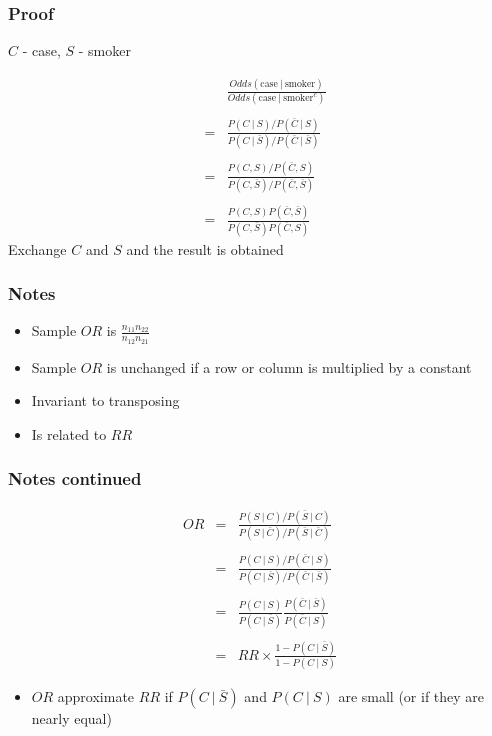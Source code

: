 \documentclass[aspectratio=169]{beamer}
\begin{document}
\begin{frame}\frametitle{Proof}
$C$ - case, $S$ - smoker

\begin{eqnarray*}
& &\frac{Odds(\mbox{case} ~|~ \mbox{smoker})}{Odds(\mbox{case} ~|~ \mbox{smoker}^c)}\\ \\
& = & \frac{P(C ~ | ~ S) / P(\bar{C} ~|~ S)}{P(C ~|~ \bar{S})/P(\bar{C} ~|~ \bar{S})} \\ \\
& = & \frac{P(C, S) / P(\bar{C}, S)}{P(C, \bar{S})/P(\bar{C}, \bar{S})} \\ \\
& = & \frac{P(C, S) P(\bar{C}, \bar{S})}{P(C,\bar{S}) P(\bar{C}, S)}
\end{eqnarray*}
Exchange $C$ and $S$ and the result is obtained
\end{frame}

\begin{frame}\frametitle{Notes}
\begin{itemize}
\item Sample $OR$ is $\frac{n_{11}n_{22}}{n_{12}n_{21}}$
\item Sample $OR$ is unchanged if a row or column is multiplied by a constant
\item Invariant to transposing
\item Is related to $RR$ 
\end{itemize}
\end{frame}

\begin{frame}\frametitle{Notes continued}
 \begin{eqnarray*}
OR & = & \frac{P(S ~|~ C)/P(\bar{S} ~|~ C)}{P(S ~|~ \bar{C})/P(\bar{S} ~|~ \bar{C})} \\ \\
   & = & \frac{P(C ~|~ S)/P(\bar{C} ~|~ S)}{P(C ~|~ \bar{S})/P(\bar{C} ~|~ \bar{S})} \\ \\
   & = & \frac{P(C ~|~ S)}{P(C ~|~ \bar{S})}
         \frac{P(\bar{C} ~|~ \bar{S})}{P(\bar{C} ~|~ S)} \\ \\
   & = & RR \times \frac{1 - P(C ~|~ \bar{S})}{1 - P(C ~|~ S)}
  \end{eqnarray*}
\begin{itemize}
\item $OR$ approximate $RR$ if $P(C ~|~ \bar{S})$ and $P(C ~|~ S)$ are small
(or if they are nearly equal)
\end{itemize}
\end{frame}
\end{document}
